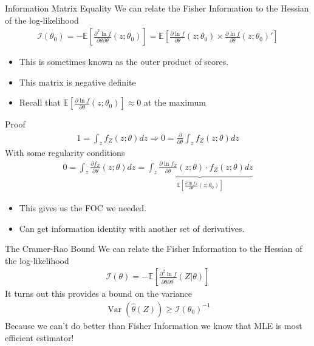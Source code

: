 \documentclass[aspectratio=169,11pt]{beamer}
\begin{document}
\begin{frame}{Information Matrix Equality}
We can relate the \alert{Fisher Information} to the Hessian of the log-likelihood
\begin{align*}
\mathcal { I } \left( \theta _ { 0 } \right) = - \mathbb { E } \left[ \frac { \partial ^ { 2 } \ln f } { \partial \theta \partial \theta } \left( z ; \theta _ { 0 } \right) \right] 
= \mathbb { E } \left[ \frac { \partial \ln f } { \partial \theta } \left( z ; \theta _ { 0 } \right) \times \frac { \partial \ln f } { \partial \theta  } \left( z ; \theta _ { 0 } \right)' \right]
\end{align*}
\begin{itemize}
    \item This is sometimes known as the \alert{outer product of scores}.
    \item This matrix is \alert{negative definite}
    \item Recall that $ \mathbb { E } \left[ \frac { \partial \ln f } { \partial \theta } \left( z ; \theta _ { 0 } \right) \right]\approx 0$ at the maximum
\end{itemize}
\end{frame}


\begin{frame}{Proof}
\begin{align*}
1 = \int _ { z } f _ { Z } ( z ; \theta ) d z \Rightarrow 0 = \frac { \partial } { \partial \theta } \int _ { z } f _ { Z } ( z ; \theta ) d z
\end{align*}
With some regularity conditions
\begin{align*}
0 = \int _ { z } \frac { \partial f _ { Z } } { \partial \theta } ( z ; \theta ) d z = \underbrace{\int _ { z } \frac { \partial \ln f _ { Z } } { \partial \theta } ( z ; \theta ) \cdot f _ { Z } ( z ; \theta ) d z}_{\mathbb { E } \left[ \frac { \partial \ln f _ { Z } } { \partial \theta } \left( z ; \theta _ { 0 } \right) \right]}
\end{align*}

\begin{itemize}
    \item This gives us the FOC we needed.
    \item Can get information identity with another set of derivatives.
    \end{itemize}
\end{frame}


\begin{frame}{The Cramer-Rao Bound}
We can relate the \alert{Fisher Information} to the Hessian of the log-likelihood
\begin{align*}
\mathcal { I } ( \theta ) = - \mathbb { E } \left[ \frac { \partial ^ { 2 } \ln f } { \partial \theta \partial \theta ^ { \prime } } ( Z | \theta ) \right]
\end{align*}
It turns out this provides a bound on the variance
\begin{align*}
\operatorname { Var } ( \hat { \theta } ( Z ) ) \geq \mathcal { I } \left( \theta _ { 0 } \right) ^ { - 1 }
\end{align*}
Because we can't do better than Fisher Information we know that MLE is most efficient estimator!
\end{frame}
\end{document}
